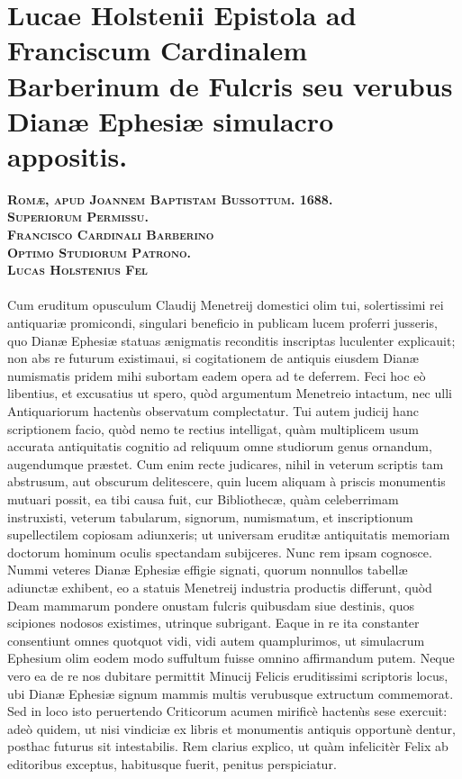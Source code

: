 \documentclass[a4paper, 11pt, oneside, polutonikogreek, latin]{article}
\begin{document}
\section{Lucae Holstenii Epistola ad Franciscum Cardinalem Barberinum de Fulcris seu verubus Dianæ Ephesiæ simulacro appositis.}
\begin{center}
\scshape\textbf{Romæ, apud Joannem Baptistam Bussottum. 1688.\\Superiorum Permissu.\\Francisco Cardinali Barberino\\Optimo Studiorum Patrono.\\Lucas Holstenius Fel}
\end{center}
\paragraph{}
Cum eruditum opusculum Claudij Menetreij domestici olim tui, solertissimi rei antiquariæ promicondi, singulari beneficio in publicam lucem proferri jusseris, quo Dianæ Ephesiæ statuas ænigmatis reconditis inscriptas luculenter explicauit; non abs re futurum existimaui, si cogitationem de antiquis eiusdem Dianæ numismatis pridem mihi subortam eadem opera ad te deferrem. Feci hoc eò libentius, et excusatius ut spero, quòd argumentum Menetreio intactum, nec ulli Antiquariorum hactenùs observatum complectatur. Tui autem judicij hanc scriptionem facio, quòd nemo te rectius intelligat, quàm multiplicem usum accurata antiquitatis cognitio ad reliquum omne studiorum genus ornandum, augendumque præstet. Cum enim recte judicares, nihil in veterum scriptis tam abstrusum, aut obscurum delitescere, quin lucem aliquam à priscis monumentis mutuari possit, ea tibi causa fuit, cur Bibliothecæ, quàm celeberrimam instruxisti, veterum tabularum, signorum, numismatum, et inscriptionum supellectilem copiosam adiunxeris; ut universam eruditæ antiquitatis memoriam doctorum hominum oculis spectandam subijceres. Nunc rem ipsam cognosce. Nummi veteres Dianæ Ephesiæ effigie signati, quorum nonnullos tabellæ adiunctæ exhibent, eo a statuis Menetreij industria productis differunt, quòd Deam mammarum pondere onustam fulcris quibusdam siue destinis, quos scipiones nodosos existimes, utrinque subrigant. Eaque in re ita constanter consentiunt omnes quotquot vidi, vidi autem quamplurimos, ut simulacrum Ephesium olim eodem modo suffultum fuisse omnino affirmandum putem. Neque vero ea de re nos dubitare permittit Minucij Felicis eruditissimi scriptoris locus, ubi Dianæ Ephesiæ signum mammis multis verubusque extructum commemorat. Sed in loco isto peruertendo Criticorum acumen mirificè hactenùs sese exercuit: adeò quidem, ut nisi vindiciæ ex libris et monumentis antiquis opportunè dentur, posthac futurus sit intestabilis. Rem clarius explico, ut quàm infelicitèr Felix ab editoribus exceptus, habitusque fuerit, penitus perspiciatur.
\end{document}
